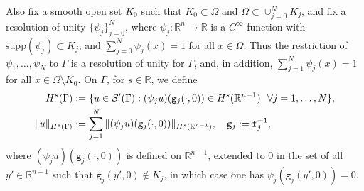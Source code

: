 \documentclass[10pt,reqno,a4paper]{article}
\numberwithin{equation}{section}
\theoremstyle{plain}
\theoremstyle{definition}
\newcommand{\R}{{\mathbb R}}
\newcommand{\mS}{\mathcal{S}}
\newcommand{\Om}{\Omega}
\begin{document}
\vspace{-4pt}

Also fix a smooth open set $K_0$ such that $\overline K_0 \subset \Om$ 
and $\overline \Om \subset \cup_{j=0}^N K_j$, 
and fix a resolution of unity $\{ \psi_j \}_{j=0}^N$, 
where $\psi_j : \R^n \to \R$ is a $C^\infty$ function with $\mathrm{supp}(\psi_j) \subset K_j$,
and $\sum_{j=0}^N \psi_j(x) = 1$ for all $x \in \overline \Om$. 
Thus the restriction of $\psi_1, \ldots, \psi_N$ to $\Gamma$ is a resolution of unity for $\Gamma$, 
and, in addition, $\sum_{j=1}^N \psi_j(x) = 1$ for all $x \in \overline \Om \setminus K_0$. 
On $\Gamma$, for $s \in \R$, we define 
\begin{align}
H^s(\Gamma) 
& := \{ u \in \mS'(\Gamma) : (\psi_j u)(\mathtt g_j( \cdot, 0)) \in H^s(\R^{n-1}) \ \ 
\forall j = 1, \ldots, N \},
\notag \\
\| u \|_{H^s(\Gamma)} 
& := \sum_{j=1}^N \| (\psi_j u)(\mathtt g_j(\cdot,0)) \|_{H^s(\R^{n-1})}, 
\quad \mathtt g_j := \mathtt f_j^{-1},
\label{def.H.s.manifold}
\end{align}
where $(\psi_j u)(\mathtt g_j(\cdot,0))$ is defined on $\R^{n-1}$, 
extended to 0 in the set of all $y' \in \R^{n-1}$ such that $\mathtt g_j(y',0) \notin K_j$,
in which case one has $\psi_j (\mathtt g_j(y',0)) = 0$. 

\medskip
\end{document}
